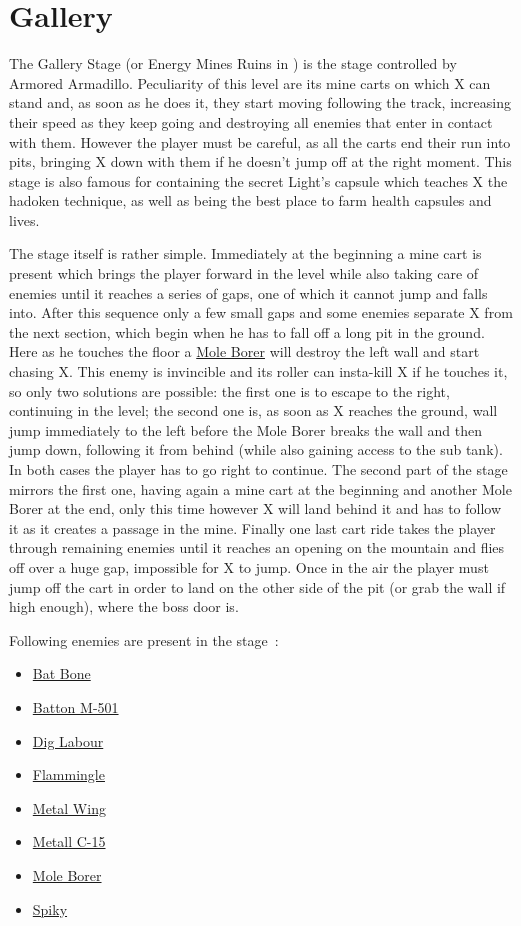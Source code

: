 \section{Gallery}
The Gallery Stage (or Energy Mines Ruins in \mhx) is the stage controlled by Armored Armadillo. Peculiarity of this level are its mine carts on which X can stand and, as soon as he does it, they start moving following the track, increasing their speed as they keep going and destroying all enemies that enter in contact with them. However the player must be careful, as all the carts end their run into pits, bringing X down with them if he doesn't jump off at the right moment. This stage is also famous for containing the secret Light's capsule which teaches X the hadoken technique, as well as being the best place to farm health capsules and lives.

The stage itself is rather simple. Immediately at the beginning a mine cart is present which brings the player forward in the level while also taking care of enemies until it reaches a series of gaps, one of which it cannot jump and falls into. After this sequence only a few small gaps and some enemies separate X from the next section, which begin when he has to fall off a long pit in the ground. Here as he touches the floor a \hyperlink{miniboss:Mole_Borer}{Mole Borer} will destroy the left wall and start chasing X. This enemy is invincible and its roller can insta-kill X if he touches it, so only two solutions are possible: the first one is to escape to the right, continuing in the level; the second one is, as soon as X reaches the ground, wall jump immediately to the left before the Mole Borer breaks the wall and then jump down, following it from behind (while also gaining access to the sub tank). In both cases the player has to go right to continue. The second part of the stage mirrors the first one, having again a mine cart at the beginning and another Mole Borer at the end, only this time however X will land behind it and has to follow it as it creates a passage in the mine. Finally one last cart ride takes the player through remaining enemies until it reaches an opening on the mountain and flies off over a huge gap, impossible for X to jump. Once in the air the player must jump off the cart in order to land on the other side of the pit (or grab the wall if high enough), where the boss door is.

Following enemies are present in the stage~\cite{wiki:Gallery}:

\begin{itemize}
	\item \hyperlink{enem:Batton_Bone}{Bat Bone} 
	\item \hyperlink{enem:Batton_M-501}{Batton M-501} 
	\item \hyperlink{enem:Dig_Labour}{Dig Labour} 
	\item \hyperlink{enem:Flammingle}{Flammingle} 
	\item \hyperlink{enem:Metal_Wing}{Metal Wing} 
	\item \hyperlink{enem:Metall_C-15}{Metall C-15} 
	\item \hyperlink{miniboss:Mole_Borer}{Mole Borer}
	\item \hyperlink{enem:Spiky}{Spiky}
\end{itemize}


